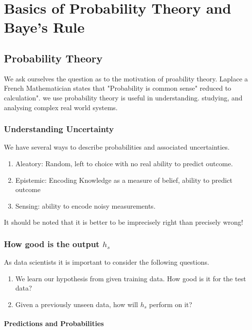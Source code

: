 \chapter{Basics of Probability Theory and Baye's Rule}

\section{Probability Theory}

We ask ourselves the question as to the motivation of proability theory. Laplace a French Mathematician states that "Probability is common sense" reduced to calculation". we use probability theory is useful in understanding. studying, and analysing complex real world systems. 

\subsection{Understanding Uncertainty}

We have several ways to describe probabilities and associated uncertainties. 
\begin{enumerate}
\item Aleatory: Random, left to choice with no real ability to predict outcome. 
\item Epistemic: Encoding Knowledge as a measure of belief, ability to predict outcome
\item Sensing: ability to encode noisy measurements.
\end{enumerate}

It should be noted that it is better to be imprecisely right than precisely wrong!


\subsection{How good is the output $h_s$}

As data scientists it is important to consider the following questions. 
\begin{enumerate}
\item We learn our hypothesis from given training data. How good is it for the test data?
\item Given a previously unseen data, how will $h_s$ perform on it? 
\end{enumerate}

\subsubsection{Predictions and Probabilities}

